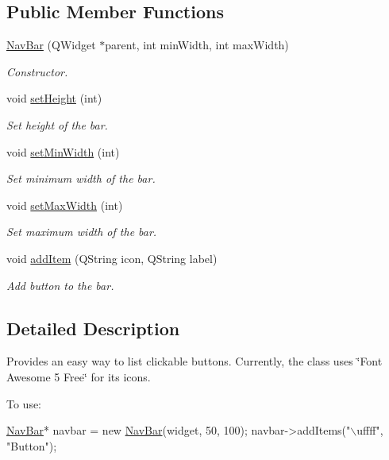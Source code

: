 \subsection*{Public Member Functions}
\begin{DoxyCompactItemize}
\item 
\hyperlink{classNavBar_a988e7dc522635e792a5690613e80f042}{Nav\-Bar} (Q\-Widget $\ast$parent, int min\-Width, int max\-Width)
\begin{DoxyCompactList}\small\item\em Constructor. \end{DoxyCompactList}\item 
void \hyperlink{classNavBar_a02df27a57fc24bdf526e99b4fed6ad33}{set\-Height} (int)
\begin{DoxyCompactList}\small\item\em Set height of the bar. \end{DoxyCompactList}\item 
void \hyperlink{classNavBar_a8990d66058effa6cb08d1c86d9837443}{set\-Min\-Width} (int)
\begin{DoxyCompactList}\small\item\em Set minimum width of the bar. \end{DoxyCompactList}\item 
void \hyperlink{classNavBar_aa91680df575ef046c811cf665e763fa0}{set\-Max\-Width} (int)
\begin{DoxyCompactList}\small\item\em Set maximum width of the bar. \end{DoxyCompactList}\item 
void \hyperlink{classNavBar_afa07fd39fd9a51070186ed69ea563c89}{add\-Item} (Q\-String icon, Q\-String label)
\begin{DoxyCompactList}\small\item\em Add button to the bar. \end{DoxyCompactList}\end{DoxyCompactItemize}


\subsection{Detailed Description}
Provides an easy way to list clickable buttons. Currently, the class uses \char`\"{}\-Font Awesome 5 Free\char`\"{} for its icons.

To use\-: 
\begin{DoxyCode}
\hyperlink{classNavBar}{NavBar}* navbar = \textcolor{keyword}{new} \hyperlink{classNavBar_a988e7dc522635e792a5690613e80f042}{NavBar}(widget, 50, 100);
navbar->addItems(\textcolor{stringliteral}{"\(\backslash\)uffff"}, \textcolor{stringliteral}{"Button"});
\end{DoxyCode}



